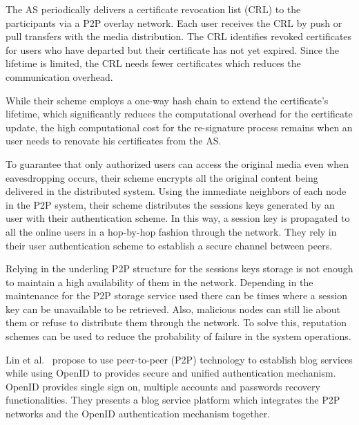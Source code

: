 The AS periodically delivers a certificate revocation list (CRL) to the
participants via a P2P overlay network. Each user receives the CRL by push or
pull transfers with the media distribution. The CRL identifies revoked
certificates for users who have departed but their certificate
 has not yet expired. Since the lifetime is limited, the
CRL needs fewer certificates which reduces the
communication overhead.

While their scheme employs a one-way hash chain to extend the
certificate’s lifetime, which significantly reduces
the computational overhead for the certificate update, the high computational cost
for the re-signature process remains when
an user needs to renovate his certificates from the AS. 

To guarantee that only authorized users can access the
original media even when eavesdropping occurs, their scheme encrypts all the 
original content being delivered in the distributed system.
Using the immediate neighbors of each node in the P2P system,
their scheme distributes the sessions keys generated by an user with their
authentication scheme.
In this way, a session key is propagated to
all the online users in a hop-by-hop fashion through the network. They rely in their user authentication scheme to establish a secure channel
between peers. 

Relying in the underling P2P structure for the sessions keys storage is
not enough to maintain a high availability of them in the network. Depending in
the maintenance for the P2P storage service used there can be times where a
session key can be unavailable to be retrieved. Also, malicious
nodes can still lie about them or refuse to distribute them through the
network. To solve this, reputation schemes can be used to reduce the
probability of failure in the system operations.


Lin et al.~\cite{lin2008p2p} propose to use peer-to-peer (P2P) technology to
establish blog services while using OpenID to provides secure and unified
authentication mechanism. OpenID provides single sign on, multiple accounts and
passwords recovery functionalities. They presents a blog service platform which integrates the P2P networks and the
OpenID authentication mechanism together.





